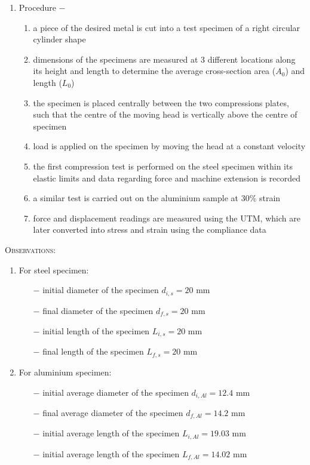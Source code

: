 \documentclass[a4paper, 11pt]{article}
\begin{document}
\begin{enumerate}[label=(\alph*)]
	\item {Procedure} $-$ 
	\begin{enumerate}[label=\roman*)]
		\item a piece of the desired metal is cut into a test specimen of a right circular cylinder shape
		\item dimensions of the specimens are measured at 3 different locations along its height and length to determine the  average cross-section area ($A_0$) and length ($L_0$)
		\item the specimen is placed centrally between the two compressions plates, such that the centre of the moving
head is vertically above the centre of specimen
		\item load is applied on the specimen by moving the head at a constant velocity
		\item the first compression test is performed on the steel specimen within its elastic limits and data regarding force and machine extension is recorded
		\item a similar test is carried out on the aluminium sample at 30\% strain
		\item force and displacement readings are measured using the UTM, which are later converted into stress and strain using the compliance data
	\end{enumerate}
\end{enumerate}
\newpage
\textsc{Observations:}

\begin{enumerate}[label=(\alph*)]
	\item For steel specimen:
\vspace{-3mm}
	
	\begin{itemize}
		\itemsep0em
		\item[$-$] initial diameter of the specimen $d_{i,s}=20\text{ mm}$
		\item[$-$] final diameter of the specimen $d_{f,s}=20\text{ mm}$
		\item[$-$] initial length of the specimen $L_{i,s}=20\text{ mm}$
		\item[$-$] final length of the specimen $L_{f,s}=20\text{ mm}$
	\end{itemize}
	\item For aluminium specimen:
\vspace{-3mm}

	\begin{itemize}
		\itemsep0em
		\item[$-$] initial average diameter of the specimen $d_{i,Al}=12.4\text{ mm}$
		\item[$-$] final average diameter of the specimen $d_{f,Al}=14.2\text{ mm}$
		\item[$-$] initial average length of the specimen $L_{i,Al}=19.03\text{ mm}$
		\item[$-$] initial average length of the specimen $L_{f,Al}=14.02\text{ mm}$
	\end{itemize}
\end{enumerate}
\end{document}
